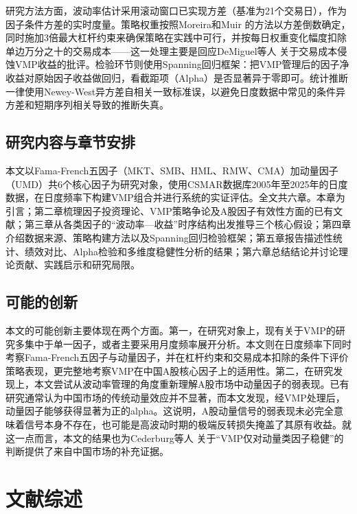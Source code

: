 \documentclass[
    decl-page,
    oneside,
  ]{njuthesis}
\begin{document}
研究方法方面，波动率估计采用滚动窗口已实现方差（基准为21个交易日），作为因子条件方差的实时度量。策略权重按照Moreira和Muir \cite{moreira2017volatility} 的方法以方差倒数确定，同时施加3倍最大杠杆约束来确保策略在实践中可行，并按每日权重变化幅度扣除单边万分之十的交易成本——这一处理主要是回应DeMiguel等人 \cite{demiguel2024transaction} 关于交易成本侵蚀VMP收益的批评。检验环节则使用Spanning回归框架：把VMP管理后的因子净收益对原始因子收益做回归，看截距项（Alpha）是否显著异于零即可。统计推断一律使用Newey-West异方差自相关一致标准误，以避免日度数据中常见的条件异方差和短期序列相关导致的推断失真。

\section{研究内容与章节安排}

本文以Fama-French五因子（MKT、SMB、HML、RMW、CMA）加动量因子（UMD）共6个核心因子为研究对象，使用CSMAR数据库2005年至2025年的日度数据，在日度频率下构建VMP组合并进行系统的实证评估。全文共六章。本章为引言；第二章梳理因子投资理论、VMP策略争论及A股因子有效性方面的已有文献；第三章从各类因子的“波动率—收益”时序结构出发推导三个核心假设；第四章介绍数据来源、策略构建方法以及Spanning回归检验框架；第五章报告描述性统计、绩效对比、Alpha检验和多维度稳健性分析的结果；第六章总结结论并讨论理论贡献、实践启示和研究局限。

\section{可能的创新}

本文的可能创新主要体现在两个方面。第一，在研究对象上，现有关于VMP的研究多集中于单一因子，或者主要采用月度频率展开分析。本文则在日度频率下同时考察Fama-French五因子与动量因子，并在杠杆约束和交易成本扣除的条件下评价策略表现，更完整地考察VMP在中国A股核心因子上的适用性。第二，在研究发现上，本文尝试从波动率管理的角度重新理解A股市场中动量因子的弱表现。已有研究通常认为中国市场的传统动量效应并不显著，而本文发现，经VMP处理后，动量因子能够获得显著为正的alpha。这说明，A股动量信号的弱表现未必完全意味着信号本身不存在，也可能是高波动时期的极端反转损失掩盖了其原有收益。就这一点而言，本文的结果也为Cederburg等人 \cite{cederburg2020performance} 关于“VMP仅对动量类因子稳健”的判断提供了来自中国市场的补充证据。

\chapter{文献综述}
\end{document}
